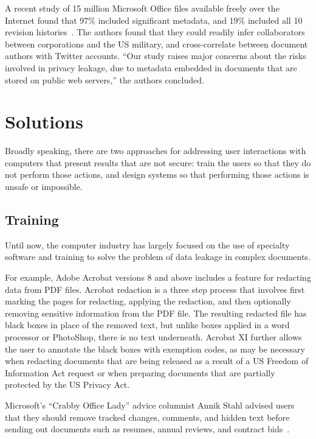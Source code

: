 A recent study of 15 million Microsoft Office files available freely over the
Internet found that 97\% included significant metadata, and 19\%
included all 10 revision histories~\cite{6503202}. The authors found
that they could readily infer collaborators between corporations and
the US military, and cross-correlate between document authors with
Twitter accounts. ``Our study raises major concerns about the risks
involved in privacy leakage, due to metadata embedded in documents
that are stored on public web servers,'' the authors concluded.


\section{Solutions}
Broadly speaking, there are two approaches for addressing user
interactions with computers that present results that are not secure:
train the users so that they do not perform those actions, and design
systems so that performing those actions is unsafe or
impossible. 


\subsection{Training}

Until now, the computer industry has largely focused on
the use of specialty software and training to solve the problem of
data leakage in complex documents. 

For example, Adobe Acrobat versions 8 and above includes a feature for
redacting data from PDF files. Acrobat redaction is a three step process
that involves first marking the pages for redacting, applying the
redaction, and then optionally removing sensitive information from the
PDF file. The resulting redacted file has black boxes in place of the
removed text, but unlike boxes applied in a word processor or
PhotoShop, there is no text underneath.  Acrobat XI further allows
the user to annotate the black boxes with exemption codes, as may be
necessary when redacting documents that are being released as a result
of a US Freedom of Information Act request or when preparing documents
that are partially protected by the US Privacy Act. 


Microsoft's ``Crabby Office Lady'' advice columnist Annik Stahl
advised users that they should remove
tracked changes, comments, and hidden text before sending out
documents such as resumes, annual reviews, and contract bids~\cite{microsoft-track-changes}.



